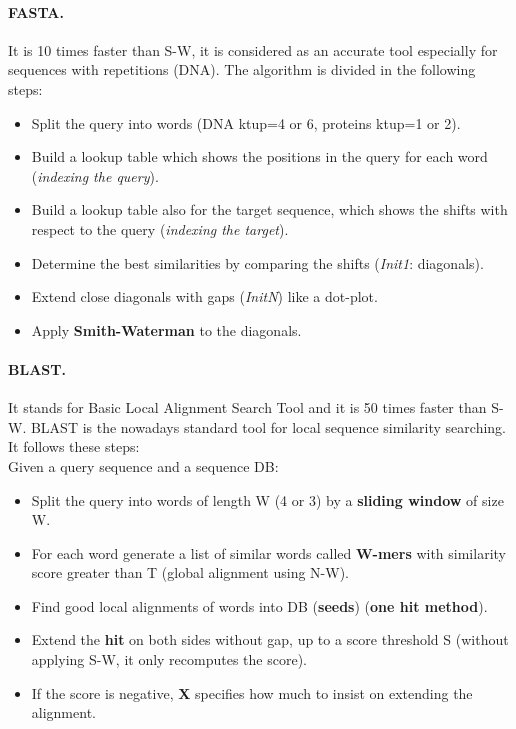 \paragraph*{FASTA.} It is 10 times faster than S-W, it is considered as an accurate tool especially for sequences with repetitions (DNA). The algorithm is divided in the following steps:
\begin{itemize}
	\item Split the query into words (DNA ktup=4 or 6, proteins	ktup=1 or 2).
	\item Build a lookup table which shows the positions in the query for each word (\textit{indexing the query}).
	\item Build a lookup table also for the target sequence, which shows the shifts with respect to the query (\textit{indexing the target}).
	\item Determine the best similarities by comparing the shifts (\textit{Init1}: diagonals).
	\item Extend close diagonals with gaps (\textit{InitN}) like a dot-plot.
	\item Apply \textbf{Smith-Waterman} to the diagonals.  
\end{itemize}

\paragraph*{BLAST.} It stands for Basic Local Alignment Search Tool and it is 50 times faster than S-W. BLAST is the nowadays standard tool for local sequence similarity searching. It follows these steps:\\
Given a query sequence and a sequence DB:
\begin{itemize}
	\item Split the query into words of length W (4 or 3) by a \textbf{sliding window} of size W.
	\item For each word generate a list of similar words called \textbf{W-mers} with similarity score greater than T (global alignment using N-W).
	\item Find good local alignments of words into DB (\textbf{seeds}) (\textbf{one hit method}). 
	\item Extend the \textbf{hit} on both sides without gap, up to a score threshold S (without applying S-W, it only recomputes the score).
	\item If the score is negative, \textbf{X} specifies how much to insist on extending the alignment.
\end{itemize}

